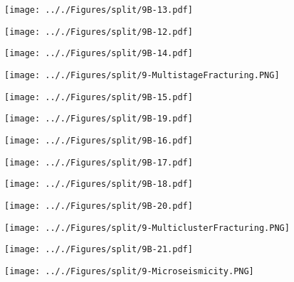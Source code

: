 \documentclass[onecolumn,11pt]{report}
\def\lthtmlcheckvsize{\ifdim\ht\sizebox<\vsize 
  \ifdim\wd\sizebox<\hsize\expandafter\hfill\fi \expandafter\vfill
  \else\expandafter\vss\fi}%
\begin{document}
{\newpage\clearpage
{}%
\texttt{[image: .././Figures/split/9B-13.pdf]}%
\lthtmlpictureZ
\lthtmlcheckvsize\clearpage}

{\newpage\clearpage
{}%
\texttt{[image: .././Figures/split/9B-12.pdf]}%
\lthtmlpictureZ
\lthtmlcheckvsize\clearpage}

{\newpage\clearpage
{}%
\texttt{[image: .././Figures/split/9B-14.pdf]}%
\lthtmlpictureZ
\lthtmlcheckvsize\clearpage}

{\newpage\clearpage
{}%
\texttt{[image: .././Figures/split/9-MultistageFracturing.PNG]}%
\lthtmlpictureZ
\lthtmlcheckvsize\clearpage}

{\newpage\clearpage
{}%
\texttt{[image: .././Figures/split/9B-15.pdf]}%
\lthtmlpictureZ
\lthtmlcheckvsize\clearpage}

{\newpage\clearpage
{}%
\texttt{[image: .././Figures/split/9B-19.pdf]}%
\lthtmlpictureZ
\lthtmlcheckvsize\clearpage}

{\newpage\clearpage
{}%
\texttt{[image: .././Figures/split/9B-16.pdf]}%
\lthtmlpictureZ
\lthtmlcheckvsize\clearpage}

{\newpage\clearpage
{}%
\texttt{[image: .././Figures/split/9B-17.pdf]}%
\lthtmlpictureZ
\lthtmlcheckvsize\clearpage}

{\newpage\clearpage
{}%
\texttt{[image: .././Figures/split/9B-18.pdf]}%
\lthtmlpictureZ
\lthtmlcheckvsize\clearpage}

{\newpage\clearpage
{}%
\texttt{[image: .././Figures/split/9B-20.pdf]}%
\lthtmlpictureZ
\lthtmlcheckvsize\clearpage}

{\newpage\clearpage
{}%
\texttt{[image: .././Figures/split/9-MulticlusterFracturing.PNG]}%
\lthtmlpictureZ
\lthtmlcheckvsize\clearpage}

{\newpage\clearpage
{}%
\texttt{[image: .././Figures/split/9B-21.pdf]}%
\lthtmlpictureZ
\lthtmlcheckvsize\clearpage}

{\newpage\clearpage
{}%
\texttt{[image: .././Figures/split/9-Microseismicity.PNG]}%
\lthtmlpictureZ
\lthtmlcheckvsize\clearpage}
\end{document}
